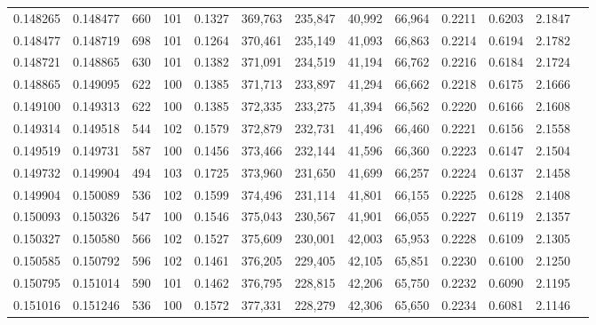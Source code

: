 \begin{tabular}{rrrrrrrrrrrrr}
0.148265 & 0.148477 &   660 & 101 &                                     0.1327 & 369,763 & 235,847 &  40,992 &  66,964 & 0.2211 & 0.6203 & 2.1847 \\
0.148477 & 0.148719 &   698 & 101 &                                     0.1264 & 370,461 & 235,149 &  41,093 &  66,863 & 0.2214 & 0.6194 & 2.1782 \\
0.148721 & 0.148865 &   630 & 101 &                                     0.1382 & 371,091 & 234,519 &  41,194 &  66,762 & 0.2216 & 0.6184 & 2.1724 \\
0.148865 & 0.149095 &   622 & 100 &                                     0.1385 & 371,713 & 233,897 &  41,294 &  66,662 & 0.2218 & 0.6175 & 2.1666 \\
0.149100 & 0.149313 &   622 & 100 &                                     0.1385 & 372,335 & 233,275 &  41,394 &  66,562 & 0.2220 & 0.6166 & 2.1608 \\
0.149314 & 0.149518 &   544 & 102 &                                     0.1579 & 372,879 & 232,731 &  41,496 &  66,460 & 0.2221 & 0.6156 & 2.1558 \\
0.149519 & 0.149731 &   587 & 100 &                                     0.1456 & 373,466 & 232,144 &  41,596 &  66,360 & 0.2223 & 0.6147 & 2.1504 \\
0.149732 & 0.149904 &   494 & 103 &                                     0.1725 & 373,960 & 231,650 &  41,699 &  66,257 & 0.2224 & 0.6137 & 2.1458 \\
0.149904 & 0.150089 &   536 & 102 &                                     0.1599 & 374,496 & 231,114 &  41,801 &  66,155 & 0.2225 & 0.6128 & 2.1408 \\
0.150093 & 0.150326 &   547 & 100 &                                     0.1546 & 375,043 & 230,567 &  41,901 &  66,055 & 0.2227 & 0.6119 & 2.1357 \\
0.150327 & 0.150580 &   566 & 102 &                                     0.1527 & 375,609 & 230,001 &  42,003 &  65,953 & 0.2228 & 0.6109 & 2.1305 \\
0.150585 & 0.150792 &   596 & 102 &                                     0.1461 & 376,205 & 229,405 &  42,105 &  65,851 & 0.2230 & 0.6100 & 2.1250 \\
0.150795 & 0.151014 &   590 & 101 &                                     0.1462 & 376,795 & 228,815 &  42,206 &  65,750 & 0.2232 & 0.6090 & 2.1195 \\
0.151016 & 0.151246 &   536 & 100 &                                     0.1572 & 377,331 & 228,279 &  42,306 &  65,650 & 0.2234 & 0.6081 & 2.1146 \\

\end{tabular}
